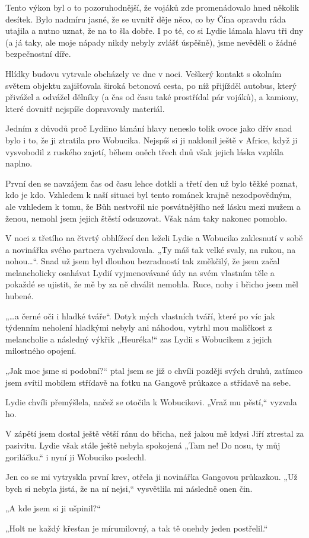 Tento výkon byl o to pozoruhodnější, že vojáků zde promenádovalo hned několik desítek. Bylo nadmíru jasné, že se uvnitř děje něco, co by Čína opravdu ráda utajila a nutno uznat, že na to šla dobře. I po té, co si Lydie lámala hlavu tři dny (a já taky, ale moje nápady nikdy nebyly zvlášť úspěšně), jsme nevěděli o žádné bezpečnostní díře.

Hlídky budovu vytrvale obcházely ve dne v noci. Veškerý kontakt s okolním světem objektu zajišťovala široká betonová cesta, po níž přijížděl autobus, který přivážel a odvážel dělníky (a čas od času také prostřídal pár vojáků), a kamiony, které dovnitř nejspíše dopravovaly materiál. 

Jedním z důvodů proč Lydiino lámání hlavy neneslo tolik ovoce jako dřív snad bylo i to, že ji ztratila pro Wobucika. Nejspíš si ji naklonil ještě v Africe, když ji vysvobodil z ruského zajetí, během oněch třech dnů však jejich láska vzplála naplno. 

První den se navzájem čas od času lehce dotkli a třetí den už bylo těžké poznat, kdo je kdo. Vzhledem k naší situaci byl tento románek krajně nezodpovědným, ale vzhledem k tomu, že Bůh nestvořil nic posvátnějšího než lásku mezi mužem a ženou, nemohl jsem jejich štěstí odsuzovat. Však nám taky nakonec pomohlo.

V noci z třetího na čtvrtý obhlížecí den leželi Lydie a Wobuciko zaklesnutí v sobě a novinářka svého partnera vychvalovala. „Ty máš tak velké svaly, na rukou, na nohou…“.  Snad už jsem byl dlouhou bezradností tak změkčilý, že jsem začal melancholicky osahávat Lydií vyjmenovávané údy na svém vlastním těle a pokaždé se ujistit, že mě by za ně chválit nemohla. Ruce, nohy i břicho jsem měl hubené.

„…a černé oči i hladké tváře“. Dotyk mých vlastních tváří, které po víc jak týdenním neholení hladkými nebyly ani náhodou, vytrhl mou maličkost z melancholie a následný výkřik „Heuréka!“ zas Lydii s Wobucikem z jejich milostného opojení.

„Jak moc jsme si podobní?“ ptal jsem se již o chvíli později svých druhů, zatímco jsem svítil mobilem střídavě na fotku na Gangově průkazce a střídavě na sebe.

Lydie chvíli přemýšlela, načež se otočila k Wobucikovi. „Vraž mu pěstí,“ vyzvala ho.

V zápětí jsem dostal ještě větší ránu do břicha, než jakou mě kdysi Jiří ztrestal za pasivitu. Lydie však stále ještě nebyla spokojená „Tam ne! Do nosu, ty můj goriláčku.“ i nyní ji Wobuciko poslechl.

Jen co se mi vytryskla první krev, otřela ji novinářka Gangovou průkazkou. „Už bych si nebyla jistá, že na ní nejsi,“ vysvětlila mi následně onen čin.

 „A kde jsem si ji ušpinil?“

 „Holt ne každý křesťan je mírumilovný, a tak tě onehdy jeden postřelil.“
